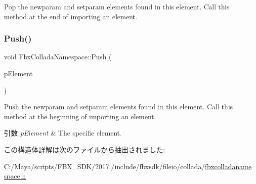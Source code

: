 Pop the newparam and setparam elements found in this element. Call this method at the end of importing an element. \mbox{\label{struct_fbx_collada_namespace_a844aeced65709b23349ed14e444c862b}} 
\subsubsection{\texorpdfstring{Push()}{Push()}}
{\footnotesize\ttfamily void Fbx\+Collada\+Namespace\+::\+Push (\begin{DoxyParamCaption}\item[{xml\+Node $\ast$}]{p\+Element }\end{DoxyParamCaption})}

Push the newparam and setparam elements found in this element. Call this method at the beginning of importing an element. 
\begin{DoxyParams}{引数}
{\em p\+Element} & The specific element. \\
\hline
\end{DoxyParams}


この構造体詳解は次のファイルから抽出されました\+:\begin{DoxyCompactItemize}
\item 
C\+:/\+Maya/scripts/\+F\+B\+X\+\_\+\+S\+D\+K/2017./include/fbxsdk/fileio/collada/\hyperlink{fbxcolladanamespace_8h}{fbxcolladanamespace.\+h}\end{DoxyCompactItemize}
